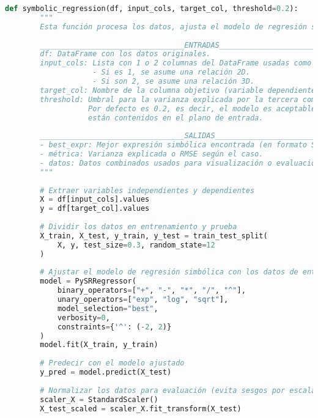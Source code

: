 \documentclass[11pt, a4paper]{article} %
\begin{document}
\begin{lstlisting}[language=Python, caption=Implementación del modelo de regresión simbólica, basicstyle=\tiny,label=lst:foo]
    def symbolic_regression(df, input_cols, target_col, threshold=0.2):
        """
        Esta función procesa los datos, ajusta el modelo de regresión simbólica (SR) y cuantifica su ajuste.
    
        _________________________________ENTRADAS________________________________
        df: DataFrame con los datos originales.
        input_cols: Lista con 1 o 2 columnas del DataFrame usadas como variables independientes.
                    - Si es 1, se asume una relación 2D.
                    - Si son 2, se asume una relación 3D.
        target_col: Nombre de la columna objetivo (variable dependiente).
        threshold: Umbral para la varianza explicada por la tercera componente (en caso 3D).
                   Por defecto es 0.2, es decir, el modelo es aceptable si el 80% de los datos
                   están contenidos en el plano de entrada.
    
        _________________________________SALIDAS________________________________
        - best_expr: Mejor expresión simbólica encontrada (en formato SymPy) si cumple el umbral.
        - métrica: Varianza explicada o RMSE según el caso.
        - datos: Datos combinados usados para visualización o evaluación.
        """
    
        # Extraer variables independientes y dependientes
        X = df[input_cols].values
        y = df[target_col].values
    
        # Dividir los datos en entrenamiento y prueba
        X_train, X_test, y_train, y_test = train_test_split(
            X, y, test_size=0.3, random_state=12
        )
    
        # Ajustar el modelo de regresión simbólica con los datos de entrenamiento
        model = PySRRegressor(
            binary_operators=["+", "-", "*", "/", "^"],
            unary_operators=["exp", "log", "sqrt"],
            model_selection="best",
            verbosity=0,
            constraints={'^': (-2, 2)}
        )
        model.fit(X_train, y_train)
    
        # Predecir con el modelo ajustado
        y_pred = model.predict(X_test)
    
        # Normalizar los datos para evaluación (evita sesgos por escalas)
        scaler_X = StandardScaler()
        X_test_scaled = scaler_X.fit_transform(X_test)
    

\end{lstlisting}
\end{document}

